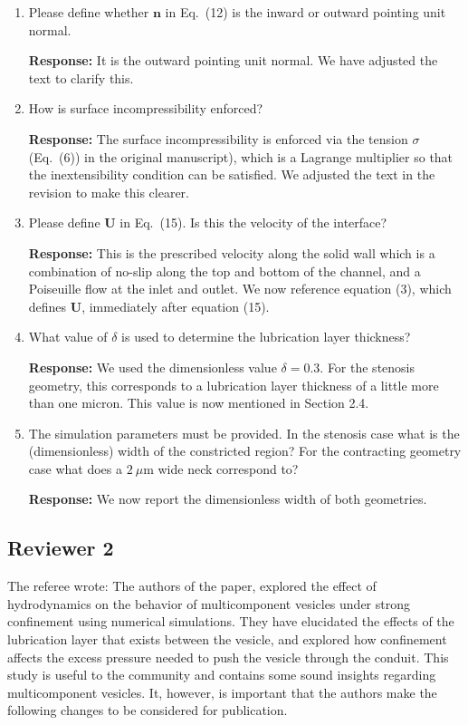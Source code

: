 \documentclass[11pt]{article}
\begin{document}
\begin{enumerate}
\item Please define whether $\mathbf{n}$ in Eq.~(12) is the inward or outward pointing unit normal.

\noindent
{\bf Response:} It is the outward pointing unit normal.  We have adjusted the text to clarify this.

\item How is surface incompressibility enforced?

\noindent
{\bf Response:} The surface incompressibility is enforced via the tension $\sigma$ (Eq.~(6)) in the original manuscript), 
which is a Lagrange multiplier so that the inextensibility condition can be satisfied. We adjusted the text in the revision to make this clearer.

\item Please define $\mathbf{U}$ in Eq.~(15). Is this the velocity of
  the interface?

{\bf Response:} This is the prescribed velocity along the solid wall
    which is a combination of no-slip along the top and bottom of the
    channel, and a Poiseuille flow at the inlet and outlet. We now
    reference equation (3), which defines $\mathbf{U}$, immediately
    after equation (15). 

\item What value of $\delta$ is used to determine the lubrication layer
  thickness?

{\bf Response:} We used the dimensionless value $\delta = 0.3$. For the
stenosis geometry, this corresponds to a lubrication layer thickness of
a little more than one micron. This value is now mentioned in Section
2.4.

\item The simulation parameters must be provided. In the stenosis case
  what is the (dimensionless) width of the constricted region? For the
    contracting geometry case what does a $2~\mu$m wide neck correspond
    to?

{\bf Response:} We now report the dimensionless width of both
geometries.

\end{enumerate}

\newpage 
\subsection*{Reviewer 2}

The referee wrote: The authors of the paper, explored the effect of
hydrodynamics on the behavior of multicomponent vesicles under strong
confinement using numerical simulations. They have elucidated the
effects of the lubrication layer that exists between the vesicle, and
explored how confinement affects the excess pressure needed to push the
vesicle through the conduit. This study is useful to the community and
contains some sound insights regarding multicomponent vesicles. It,
however, is important that the authors make the following changes to be
considered for publication.
\end{document}
